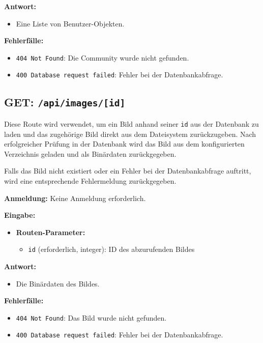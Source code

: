 \documentclass[a4paper,12pt]{article}
\begin{document}
\textbf{Antwort:}
\begin{itemize}
    \item Eine Liste von Benutzer-Objekten.
\end{itemize}

\textbf{Fehlerfälle:}
\begin{itemize}
    \item \texttt{404 Not Found}: Die Community wurde nicht gefunden.
    \item \texttt{400 Database request failed}: Fehler bei der Datenbankabfrage.
\end{itemize}

\newpage
\subsection{GET: \texttt{/api/images/[id]}}

Diese Route wird verwendet, um ein Bild anhand seiner \texttt{id} aus der Datenbank zu laden und das zugehörige Bild direkt aus dem Dateisystem zurückzugeben. Nach erfolgreicher Prüfung in der Datenbank wird das Bild aus dem konfigurierten Verzeichnis geladen und als Binärdaten zurückgegeben.

Falls das Bild nicht existiert oder ein Fehler bei der Datenbankabfrage auftritt, wird eine entsprechende Fehlermeldung zurückgegeben.

\textbf{Anmeldung:} Keine Anmeldung erforderlich.

\textbf{Eingabe:}
\begin{itemize}
    \item \textbf{Routen-Parameter:}
    \begin{itemize}
        \item \texttt{id} (erforderlich, integer): ID des abzurufenden Bildes
    \end{itemize}
\end{itemize}

\textbf{Antwort:}
\begin{itemize}
    \item Die Binärdaten des Bildes.
\end{itemize}

\textbf{Fehlerfälle:}
\begin{itemize}
    \item \texttt{404 Not Found}: Das Bild wurde nicht gefunden.
    \item \texttt{400 Database request failed}: Fehler bei der Datenbankabfrage.
\end{itemize}
\end{document}
